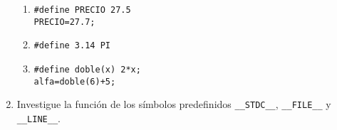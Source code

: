\begin{enumerate}
\begin{enumerate}[label=\alph*.]
\item  
\begin{lstlisting}
#define PRECIO 27.5
PRECIO=27.7;
\end{lstlisting}

\item  
\begin{lstlisting}
#define 3.14 PI
\end{lstlisting}

\item  
\begin{lstlisting}
#define doble(x) 2*x;
alfa=doble(6)+5;
\end{lstlisting}
\end{enumerate}
\item Investigue la función de los símbolos predefinidos \lstinline{__STDC__}, \lstinline{__FILE__} y \lstinline{__LINE__}.
\end{enumerate}


